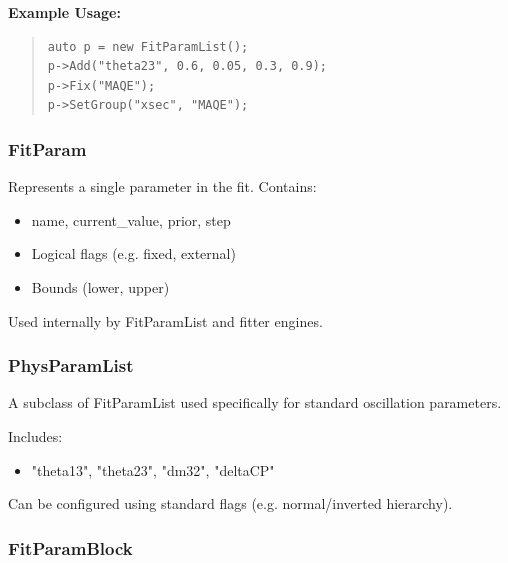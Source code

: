 \vspace{0.5em}
\noindent\textbf{Example Usage:}

\begin{quote}
\begin{lstlisting}
auto p = new FitParamList();
p->Add("theta23", 0.6, 0.05, 0.3, 0.9);
p->Fix("MAQE");
p->SetGroup("xsec", "MAQE");
\end{lstlisting}
\end{quote}

\vspace{1em}
\subsubsection*{\color{cadmiumgreen}\bf FitParam}

Represents a single parameter in the fit. Contains:

\begin{itemize}
  \item {\color{amber}name}, {\color{amber}current\_value}, {\color{amber}prior}, {\color{amber}step}
  \item Logical flags (e.g. {\color{amber}fixed}, {\color{amber}external})
  \item Bounds ({\color{amber}lower}, {\color{amber}upper})
\end{itemize}

Used internally by {\color{cadmiumgreen} FitParamList} and fitter engines.

\vspace{1em}
\subsubsection*{\color{cadmiumgreen}\bf PhysParamList}

A subclass of {\color{cadmiumgreen} FitParamList} used specifically for standard oscillation parameters.

Includes:

\begin{itemize}
  \item {\color{amber}"theta13"}, {\color{amber}"theta23"}, {\color{amber}"dm32"}, {\color{amber}"deltaCP"}
\end{itemize}

Can be configured using standard flags (e.g. normal/inverted hierarchy).

\vspace{1em}
\subsubsection*{\color{cadmiumgreen}\bf FitParamBlock}

